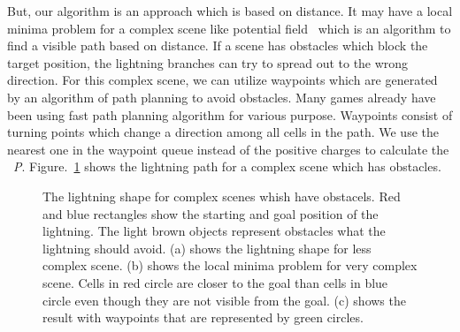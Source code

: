 But, our algorithm is an approach which is based on distance. It may have a local minima problem for a complex scene like potential field~\cite{Khatib1986} which is an algorithm to find a visible path based on distance. If a scene has obstacles which block the target position, the lightning branches can try to spread out to the wrong direction. For this complex scene, we can utilize waypoints which are generated by an algorithm of path planning to avoid obstacles. Many games already have been using fast path planning algorithm for various purpose. Waypoints consist of turning points which change a direction among all cells in the path. We use the nearest one in the waypoint queue instead of the positive charges to calculate the ~\textit{P}. Figure.~\ref{fig_comp_obs} shows the lightning path for a complex scene which has obstacles.

\begin{figure}[h]
	\centering
	\caption{The lightning shape for complex scenes whish have obstacels. Red and blue rectangles show the starting and goal position of the lightning. The light brown objects represent obstacles what the lightning should avoid. (a) shows the lightning shape for less complex scene. (b) shows the local minima problem for very complex scene. Cells in red circle are closer to the goal than cells in blue circle even though they are not visible from the goal. (c) shows the result with waypoints that are represented by green circles.}
	\label{fig_comp_obs}
\end{figure}



